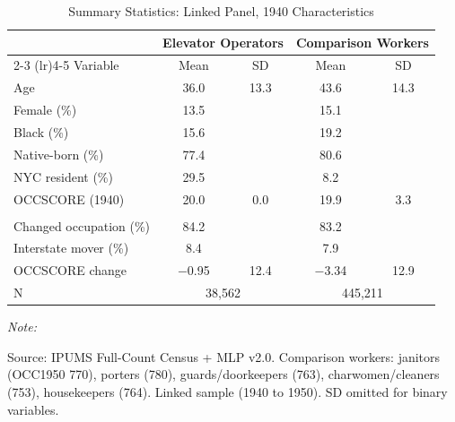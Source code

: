 \begin{table}[!h]
\centering
\caption{Summary Statistics: Linked Panel, 1940 Characteristics}
\begin{threeparttable}
\begin{tabular}[t]{lcccc}
\toprule
 & \multicolumn{2}{c}{Elevator Operators} & \multicolumn{2}{c}{Comparison Workers} \\
\cmidrule(lr){2-3} \cmidrule(lr){4-5}
Variable & Mean & SD & Mean & SD \\
\midrule
Age & 36.0 & 13.3 & 43.6 & 14.3 \\
Female (\%) & 13.5 & & 15.1 & \\
Black (\%) & 15.6 & & 19.2 & \\
Native-born (\%) & 77.4 & & 80.6 & \\
NYC resident (\%) & 29.5 & & 8.2 & \\
OCCSCORE (1940) & 20.0 & 0.0 & 19.9 & 3.3 \\
\addlinespace
\multicolumn{5}{l}{\textit{1950 Outcomes}} \\
Changed occupation (\%) & 84.2 & & 83.2 & \\
Interstate mover (\%) & 8.4 & & 7.9 & \\
OCCSCORE change & $-$0.95 & 12.4 & $-$3.34 & 12.9 \\
\addlinespace
N & \multicolumn{2}{c}{38,562} & \multicolumn{2}{c}{445,211} \\
\bottomrule
\end{tabular}
\begin{tablenotes}
\item \textit{Note: }
\item Source: IPUMS Full-Count Census + MLP v2.0. Comparison workers: janitors (OCC1950 770), porters (780), guards/doorkeepers (763), charwomen/cleaners (753), housekeepers (764). Linked sample (1940 to 1950). SD omitted for binary variables.
\end{tablenotes}
\end{threeparttable}
\end{table}